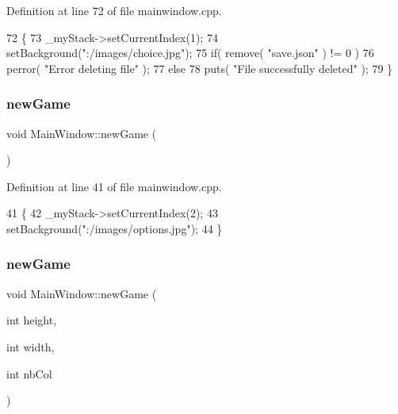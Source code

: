 Definition at line 72 of file mainwindow.\+cpp.


\begin{DoxyCode}
72                           \{
73     \_myStack->setCurrentIndex(1);
74     setBackground(\textcolor{stringliteral}{":/images/choice.jpg"});
75     \textcolor{keywordflow}{if}( \textcolor{keyword}{remove}( \textcolor{stringliteral}{"save.json"} ) != 0 )
76         perror( \textcolor{stringliteral}{"Error deleting file"} );
77       \textcolor{keywordflow}{else}
78         puts( \textcolor{stringliteral}{"File successfully deleted"} );
79 \}
\end{DoxyCode}
\hypertarget{class_main_window_a36838285112f056c6e8135573918f224}{}\label{class_main_window_a36838285112f056c6e8135573918f224} 
\subsubsection{\texorpdfstring{new\+Game}{newGame}\hspace{0.1cm}{\footnotesize\ttfamily [1/2]}}
{\footnotesize\ttfamily void Main\+Window\+::new\+Game (\begin{DoxyParamCaption}{ }\end{DoxyParamCaption})\hspace{0.3cm}{\ttfamily [slot]}}



Definition at line 41 of file mainwindow.\+cpp.


\begin{DoxyCode}
41                         \{
42     \_myStack->setCurrentIndex(2);
43     setBackground(\textcolor{stringliteral}{":/images/options.jpg"});
44 \}
\end{DoxyCode}
\hypertarget{class_main_window_ae0366468fcf40ee5e65a5239ab530e96}{}\label{class_main_window_ae0366468fcf40ee5e65a5239ab530e96} 
\subsubsection{\texorpdfstring{new\+Game}{newGame}\hspace{0.1cm}{\footnotesize\ttfamily [2/2]}}
{\footnotesize\ttfamily void Main\+Window\+::new\+Game (\begin{DoxyParamCaption}\item[{int}]{height,  }\item[{int}]{width,  }\item[{int}]{nb\+Col }\end{DoxyParamCaption})\hspace{0.3cm}{\ttfamily [slot]}}



